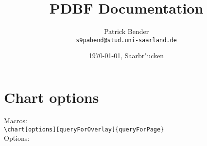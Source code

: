 \documentclass[11pt]{scrartcl}
\title{PDBF Documentation}
\author{
 Patrick Bender\\
  \texttt{s9pabend@stud.uni-saarland.de}
}
\date{\today{}, Saarbr"ucken}
\begin{document}
\maketitle





\newpage

\section{Chart options}
Macros: \\[3pt]
\verb|\chart[options][queryForOverlay]{queryForPage}| \\[8pt]
\noindent Options: \\[3pt]
\end{document}

